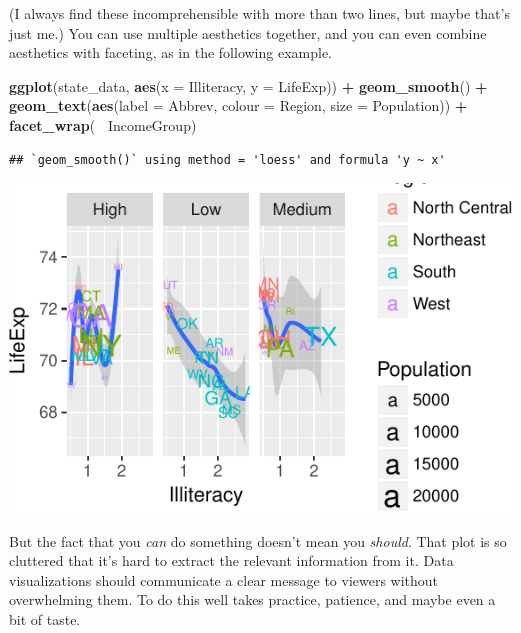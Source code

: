 \documentclass[12pt,oneside,openany]{book}
\newenvironment{Shaded}{\begin{snugshade}}{\end{snugshade}}
\newcommand{\KeywordTok}[1]{\textcolor[rgb]{0.13,0.29,0.53}{\textbf{#1}}}
\newcommand{\DataTypeTok}[1]{\textcolor[rgb]{0.13,0.29,0.53}{#1}}
\newcommand{\StringTok}[1]{\textcolor[rgb]{0.31,0.60,0.02}{#1}}
\newcommand{\OperatorTok}[1]{\textcolor[rgb]{0.81,0.36,0.00}{\textbf{#1}}}
\newcommand{\NormalTok}[1]{#1}
\begin{document}
(I always find these incomprehensible with more than two lines, but
maybe that's just me.) You can use multiple aesthetics together, and you
can even combine aesthetics with faceting, as in the following example.

\begin{Shaded}
\begin{Highlighting}[]
\KeywordTok{ggplot}\NormalTok{(state_data, }\KeywordTok{aes}\NormalTok{(}\DataTypeTok{x =}\NormalTok{ Illiteracy, }\DataTypeTok{y =}\NormalTok{ LifeExp)) }\OperatorTok{+}
\StringTok{  }\KeywordTok{geom_smooth}\NormalTok{() }\OperatorTok{+}
\StringTok{  }\KeywordTok{geom_text}\NormalTok{(}\KeywordTok{aes}\NormalTok{(}\DataTypeTok{label =}\NormalTok{ Abbrev, }\DataTypeTok{colour =}\NormalTok{ Region, }\DataTypeTok{size =}\NormalTok{ Population)) }\OperatorTok{+}
\StringTok{  }\KeywordTok{facet_wrap}\NormalTok{(}\OperatorTok{~}\StringTok{ }\NormalTok{IncomeGroup)}
\end{Highlighting}
\end{Shaded}

\begin{verbatim}
## `geom_smooth()` using method = 'loess' and formula 'y ~ x'
\end{verbatim}

\includegraphics{pdaps_files/figure-latex/too-many-things-1.pdf}

But the fact that you \emph{can} do something doesn't mean you
\emph{should}. That plot is so cluttered that it's hard to extract the
relevant information from it. Data visualizations should communicate a
clear message to viewers without overwhelming them. To do this well
takes practice, patience, and maybe even a bit of taste.
\end{document}
